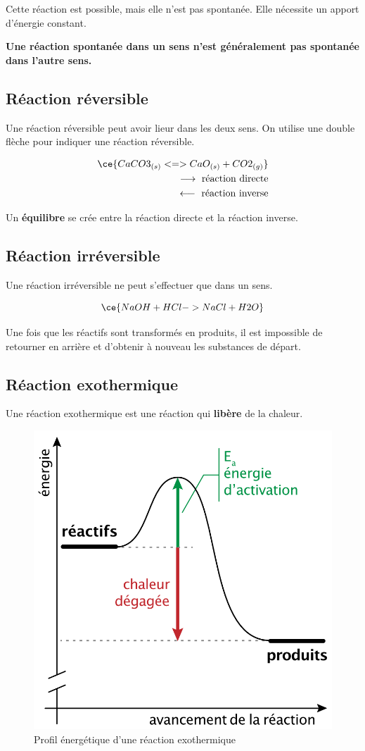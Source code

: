 \documentclass[
  11pt,
  a4paper,
  openany]{book}
\begin{document}
Cette réaction est possible, mais elle n'est pas spontanée. Elle nécessite un apport d'énergie constant.

\textbf{Une réaction spontanée dans un sens n'est généralement pas spontanée dans l'autre sens.}

\hypertarget{ruxe9action-ruxe9versible}{%
\subsection{Réaction réversible}\label{ruxe9action-ruxe9versible}}

Une réaction réversible peut avoir lieur dans les deux sens. On utilise une double flèche pour indiquer une réaction réversible.

\[ \begin{split}
  \ce{ CaCO3_{(s)} <=> CaO_{(s)} + CO2_{(g)} } \\
    \longrightarrow \text{ réaction directe} \\
    \longleftarrow \text{ réaction inverse}
    \end{split} \]

Un \textbf{équilibre} se crée entre la réaction directe et la réaction inverse.

\hypertarget{ruxe9action-irruxe9versible}{%
\subsection{Réaction irréversible}\label{ruxe9action-irruxe9versible}}

Une réaction irréversible ne peut s'effectuer que dans un sens.

\[ \ce{ NaOH + HCl -> NaCl + H2O } \]

Une fois que les réactifs sont transformés en produits, il est impossible de retourner en arrière et d'obtenir à nouveau les substances de départ.

\hypertarget{ruxe9action-exothermique}{%
\subsection{Réaction exothermique}\label{ruxe9action-exothermique}}

Une réaction exothermique est une réaction qui \textbf{libère} de la chaleur.

\begin{figure}

{\centering \includegraphics[width=0.33\linewidth]{images/chaleur-1} 

}

\caption{Profil énergétique d'une réaction exothermique}\label{fig:chaleur-1}
\end{figure}
\end{document}
